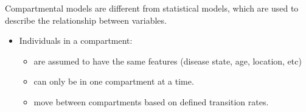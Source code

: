 \documentclass[
  ignorenonframetext,
]{beamer}
\providecommand{\tightlist}{%
  \setlength{\itemsep}{0pt}\setlength{\parskip}{0pt}}\usepackage{longtable,booktabs,array}
\begin{document}
\begin{frame}
Compartmental models are different from statistical models, which are
used to describe the relationship between variables.
\end{frame}

\begin{frame}
\begin{itemize}
\tightlist
\item
  Individuals in a compartment:

  \begin{itemize}
  \tightlist
  \item
    are assumed to have the same features (disease state, age, location,
    etc)
  \item
    can only be in one compartment at a time.
  \item
    move between compartments based on defined transition rates.
  \end{itemize}
\end{itemize}
\end{frame}
\end{document}
